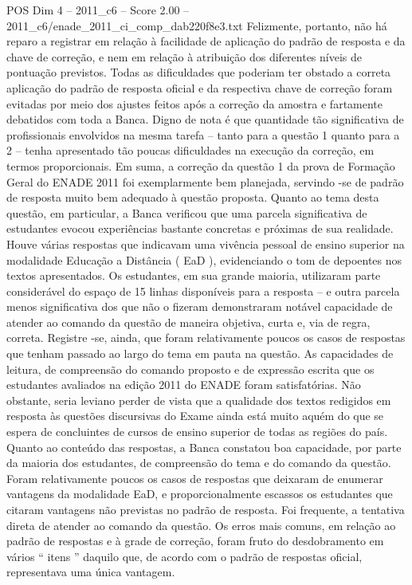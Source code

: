 \begin{textsample}{POS Dim 4 – 2011\_c6 – Score 2.00 – 2011\_c6/enade\_2011\_ci\_comp\_dab220f8e3.txt}
Felizmente, portanto, não há reparo a registrar em relação à facilidade de aplicação do padrão de resposta e da chave de correção, e nem em relação à atribuição dos diferentes níveis de pontuação previstos.
Todas as dificuldades que poderiam ter obstado a correta aplicação do padrão de resposta oficial e da respectiva chave de correção foram evitadas por meio dos ajustes feitos após a correção da amostra e fartamente debatidos com toda a Banca.
Digno de nota é que quantidade tão significativa de profissionais envolvidos na mesma tarefa – tanto para a questão 1 quanto para a 2 – tenha apresentado tão poucas dificuldades na execução da correção, em termos proporcionais.
Em suma, a correção da questão 1 da prova de Formação Geral do ENADE 2011 foi exemplarmente bem planejada, servindo -se de padrão de resposta muito bem adequado à questão proposta.
Quanto ao tema desta questão, em particular, a Banca verificou que uma parcela significativa de estudantes evocou experiências bastante concretas e próximas de sua realidade.
Houve várias respostas que indicavam uma vivência pessoal de ensino superior na modalidade Educação a Distância ( EaD ), evidenciando o tom de depoentes nos textos apresentados.
Os estudantes, em sua grande maioria, utilizaram parte considerável do espaço de 15 linhas disponíveis para a resposta – e outra parcela menos significativa dos que não o fizeram demonstraram notável capacidade de atender ao comando da questão de maneira objetiva, curta e, via de regra, correta.
Registre -se, ainda, que foram relativamente poucos os casos de respostas que tenham passado ao largo do tema em pauta na questão.
As capacidades de leitura, de compreensão do comando proposto e de expressão escrita que os estudantes avaliados na edição 2011 do ENADE foram satisfatórias.
Não obstante, seria leviano perder de vista que a qualidade dos textos redigidos em resposta às questões discursivas do Exame ainda está muito aquém do que se espera de concluintes de cursos de ensino superior de todas as regiões do país.
Quanto ao conteúdo das respostas, a Banca constatou boa capacidade, por parte da maioria dos estudantes, de compreensão do tema e do comando da questão.
Foram relativamente poucos os casos de respostas que deixaram de enumerar vantagens da modalidade EaD, e proporcionalmente escassos os estudantes que citaram vantagens não previstas no padrão de resposta.
Foi frequente, a tentativa direta de atender ao comando da questão.
Os erros mais comuns, em relação ao padrão de respostas e à grade de correção, foram fruto do desdobramento em vários “ itens ” daquilo que, de acordo com o padrão de respostas oficial, representava uma única vantagem.

\end{textsample}
